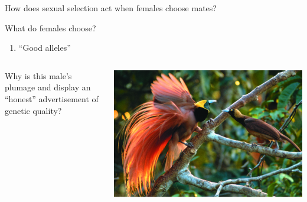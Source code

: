 \begin{frame}[t]
    \begin{adjustwidth}{-2em}{-1.5em}
        \vspace{-3mm}
        How does sexual selection act when females choose mates?

        \vspace{2mm}
        What do females choose?

        \begin{enumerate}
            \item ``Good alleles''
        \end{enumerate}

        \begin{columns}[t]


        Why is this male's plumage and display an ``honest'' advertisement of
        genetic quality?


        
        \includegraphics[width=\columnwidth]{bird-of-paradise.jpg}

        \end{columns}

    \end{adjustwidth}
\end{frame}

